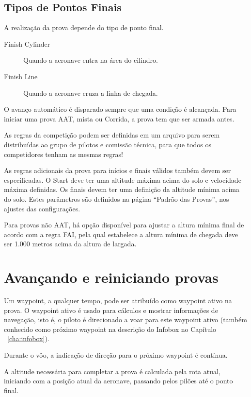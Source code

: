 \subsection*{Tipos de Pontos Finais}
A realização da prova depende do tipo de ponto final.
\begin{description}
\item[Finish Cylinder] Quando a aeronave entra na área do cilindro.
\item[Finish Line] Quando a aeronave cruza a linha de chegada.
\end{description}

O avanço automático é disparado sempre que uma condição é alcançada.  Para iniciar uma prova AAT, mista ou Corrida, a prova tem que ser armada antes.

\tip As regras da competição podem ser definidas em um arquivo para serem distribuídas ao grupo de pilotos e comissão técnica, para que todos os competidores tenham as mesmas regras!

As regras adicionais da prova para inícios e finais válidos também devem ser especificadas.  O Start deve ter uma altitude máxima acima do solo e velocidade máxima definidas.  Os finais devem ter uma definição da altitude mínima acima do solo.  Estes parâmetros são definidos na página “Padrão das Provas”, nos ajustes das configurações.

Para provas não AAT, há opção disponível para ajustar a altura mínima final de acordo com a regra FAI, pela qual estabelece a altura mínima de chegada deve ser 1.000 metros acima da altura de largada.




\section{Avançando e reiniciando provas}\label{sec:advanc-rest-tasks}
Um waypoint, a qualquer tempo, pode ser atribuído como waypoint ativo na prova.  O waypoint ativo é usado para cálculos e mostrar informações de navegação, isto é, o piloto é direcionado a voar para este waypoint ativo (também conhecido como próximo waypoint na descrição do Infobox no Capítulo ~\ref{cha:infobox}).

Durante o vôo, a indicação de direção para o próximo waypoint é contínua.

A altitude necessária para completar a prova é calculada pela rota atual, iniciando com a posição atual da aeronave, passando pelos pilões até o ponto final.

